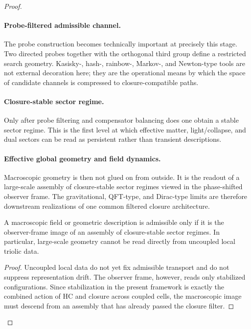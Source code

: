 \begin{proof}
\paragraph{Probe-filtered admissible channel.}
The probe construction becomes technically important at precisely this stage.
Two directed probes together with the orthogonal third group define a restricted
search geometry. Kasisky-, hash-, rainbow-, Markov-, and Newton-type tools are
not external decoration here; they are the operational means by which the space
of candidate channels is compressed to closure-compatible paths.

\paragraph{Closure-stable sector regime.}
Only after probe filtering and compensator balancing does one obtain a stable
sector regime. This is the first level at which effective matter, light/collapse,
and dual sectors can be read as persistent rather than transient descriptions.

\paragraph{Effective global geometry and field dynamics.}
Macroscopic geometry is then not glued on from outside. It is the readout of a
large-scale assembly of closure-stable sector regimes viewed in the
phase-shifted observer frame. The gravitational, QFT-type, and Dirac-type
limits are therefore downstream realizations of one common filtered closure
architecture.

\begin{proposition}
\label{prop:macro-requires-closure-assembly}
A macroscopic field or geometric description is admissible only if it is the
observer-frame image of an assembly of closure-stable sector regimes. In
particular, large-scale geometry cannot be read directly from uncoupled local
triolic data.
\end{proposition}

\begin{proof}
Uncoupled local data do not yet fix admissible transport and do not suppress
representation drift. The observer frame, however, reads only stabilized
configurations. Since stabilization in the present framework is exactly the
combined action of HC and closure across coupled cells, the macroscopic image
must descend from an assembly that has already passed the closure filter.
\end{proof}


\end{proof}
